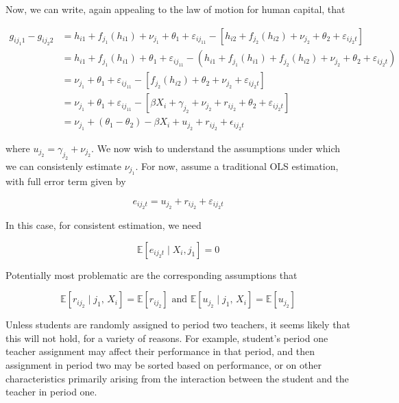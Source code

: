 \documentclass{article}
\begin{document}
Now, we can write, again appealing to the law of motion for human capital, that 

\begin{align}
	g_{ij_{1}1}-g_{ij_{2}2} & = h_{i1} + f_{j_1}(h_{i1}) + \nu_{j_1} + \theta_{1} + \varepsilon_{ij_11} - [h_{i2} + f_{j_2}(h_{i2}) + \nu_{j_2} + \theta_{2} + \varepsilon_{ij_2t}]\\
	& = h_{i1} + f_{j_1}(h_{i1}) + \theta_{1} + \varepsilon_{ij_11} - (h_{i1} + f_{j_1}(h_{i1}) + f_{j_2}(h_{i2}) + \nu_{j_2} + \theta_{2} + \varepsilon_{ij_2t})\\
	& = \nu_{j_1} + \theta_1 + \varepsilon_{ij_11} - [f_{j_2}(h_{i2}) + \theta_2 + \nu_{j_2} + \varepsilon_{ij_2t}]\\
	& = \nu_{j_1} + \theta_{1} + \varepsilon_{ij_11} - [\beta X_i + \gamma_{j_2} + \nu_{j_2} + r_{ij_2} + \theta_2 + \varepsilon_{ij_2t}]\\
	& = \nu_{j_1} + (\theta_1-\theta_2) - \beta X_i + u_{j_2} + r_{ij_2} + \epsilon_{ij_2t}
\end{align}

where $u_{j_2} = \gamma_{j_2} + \nu_{j_2}$. We now wish to understand the assumptions under which we can consistenly estimate $\nu_{j_1}$. For now, assume a traditional OLS estimation, with full error term given by

\[
	e_{ij_2t} = u_{j_2} + r_{ij_2} + \varepsilon_{ij_2t}
\]

In this case, for consistent estimation, we need

\[
	\mathbb{E}[e_{ij_2t} \mid X_i, j_1] = 0 
\]

Potentially most problematic are the corresponding assumptions that 

\[
	\mathbb{E}[r_{ij_2} \mid j_1, \, X_i] = \mathbb{E}[r_{ij_2}] \textrm{ and } \mathbb{E}[u_{j_2} \mid j_1, \, X_i] = \mathbb{E}[u_{j_2}] 
\]

Unless students are randomly assigned to period two teachers, it seems likely that this will not hold, for a variety of reasons. For example, student's period one teacher assignment may affect their performance in that period, and then assignment in period two may be sorted based on performance, or on other characteristics primarily arising from the interaction between the student and the teacher in period one. 



\end{document}
